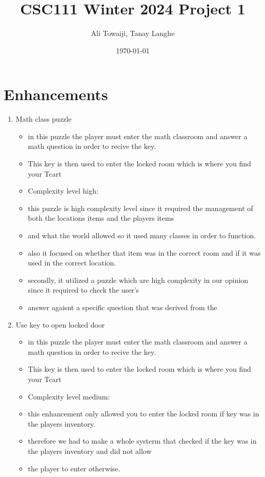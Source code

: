\documentclass[11pt]{article}
\title{CSC111 Winter 2024 Project 1}
\author{Ali Towaiji, Tanay Langhe}
\date{\today}
\begin{document}
\maketitle

\section*{Enhancements}


\begin{enumerate}

\item Math class puzzle
	\begin{itemize}
	\item in this puzzle the player must enter the math classroom and answer a math question in order to recive the key.
	\item This key is then used to enter the locked room which is where you find your Tcart
	\item Complexity level high:
	\item this puzzle is high complexity level since it required the management of both the locations items and the players items
	\item and what the world allowed so it used many classes in order to function.
	\item also it focused on whether that item was in the correct room and if it was used in the correct location.
	\item secondly, it utilized a puzzle which are high complexity in our opinion since it required to check the user's
	\item answer agaisnt a specific question that was derived from the
	\end{itemize}

\item Use key to open locked door
	\begin{itemize}
	\item in this puzzle the player must enter the math classroom and answer a math question in order to recive the key.
	\item This key is then used to enter the locked room which is where you find your Tcart
	\item Complexity level medium:
	\item this enhancement only allowed you to enter the locked room if key was in the players inventory.
	\item therefore we had to make a whole systerm that checked if the key was in the players inventory and did not allow
	\item the player to enter otherwise.
	\end{itemize}


\end{enumerate}
\end{document}
